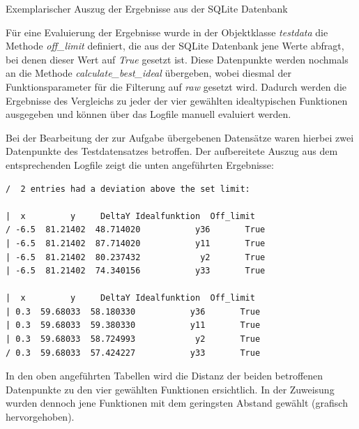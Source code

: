 \begin{table}[H]
\small
\centering
{}
\caption{Exemplarischer Auszug der Ergebnisse aus der SQLite Datenbank}
\label{tab:sqlitetest.csv}
\end{table} 

Für eine Evaluierung der Ergebnisse wurde in der Objektklasse \emph{testdata} die Methode \emph{off\_limit} definiert, die aus der SQLite Datenbank jene Werte abfragt, bei denen dieser Wert auf \emph{True} gesetzt ist. Diese Datenpunkte werden nochmals an die Methode \emph{calculate\_best\_ideal} übergeben, wobei diesmal der Funktionsparameter für die Filterung auf \emph{raw} gesetzt wird. Dadurch werden die Ergebnisse des Vergleichs zu jeder der vier gewählten idealtypischen Funktionen ausgegeben und können über das Logfile manuell evaluiert werden.

Bei der Bearbeitung der zur Aufgabe übergebenen Datensätze waren hierbei zwei Datenpunkte des Testdatensatzes betroffen. Der aufbereitete Auszug aus dem entsprechenden Logfile zeigt die unten angeführten Ergebnisse:

\begin{lstlisting}[title={Datenpunkte mit überschrittenem Maximalabstand},
				   label=offlimit]
/  2 entries had a deviation above the set limit:

|  x         y     DeltaY Idealfunktion  Off_limit
/ -6.5  81.21402  48.714020           y36       True
| -6.5  81.21402  87.714020           y11       True
| -6.5  81.21402  80.237432            y2       True
| -6.5  81.21402  74.340156           y33       True

|  x         y     DeltaY Idealfunktion  Off_limit
| 0.3  59.68033  58.180330           y36       True
| 0.3  59.68033  59.380330           y11       True
| 0.3  59.68033  58.724993            y2       True
/ 0.3  59.68033  57.424227           y33       True
\end{lstlisting}

In den oben angeführten Tabellen wird die Distanz der beiden betroffenen Datenpunkte zu den vier gewählten Funktionen ersichtlich. In der Zuweisung wurden dennoch jene Funktionen mit dem geringsten Abstand gewählt (grafisch hervorgehoben).


